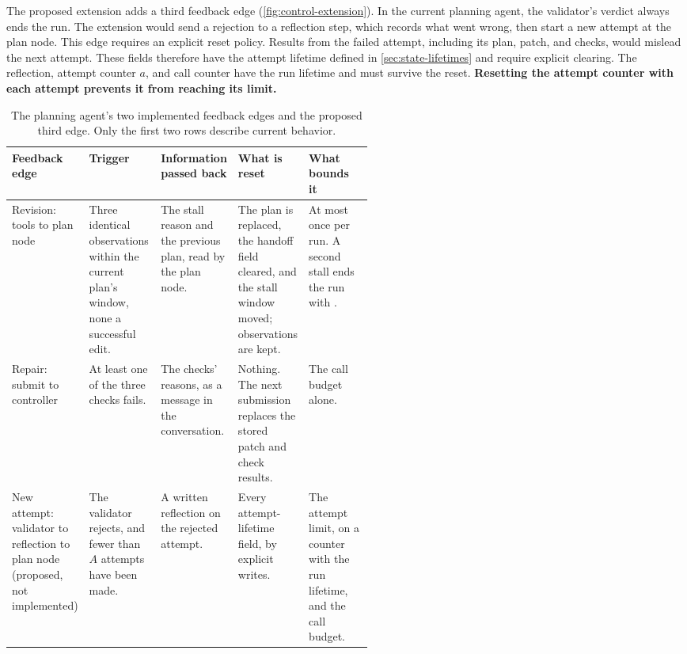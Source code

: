 The proposed extension adds a third feedback edge (\cref{fig:control-extension}). In the current
planning agent, the validator's verdict always ends the run. The extension would send a rejection to a
reflection step, which records what went wrong, then start a new attempt at the plan node. This
edge requires an explicit reset policy. Results from the failed attempt, including its plan,
patch, and checks, would mislead the next attempt. These fields therefore have the attempt lifetime
defined in \cref{sec:state-lifetimes} and require explicit clearing. The reflection, attempt counter
$a$, and call counter have the run lifetime and must survive the reset. \textbf{Resetting the
attempt counter with each attempt prevents it from reaching its limit.}

\begin{table}[tbp]
  \centering
  \begin{adjustbox}{width=\linewidth}\begin{tabularx}{\linewidth}{@{}L{0.14\linewidth}L{0.2\linewidth}XXL{0.19\linewidth}@{}}
    \toprule
    \textbf{Feedback edge} & \textbf{Trigger} & \textbf{Information passed back} & \textbf{What is reset}
      & \textbf{What bounds it} \\
    \midrule
    Revision: tools to plan node & Three identical observations within the current plan's window, none a
      successful edit. & The stall reason and the previous plan, read by the plan node. & The plan is
      replaced, the handoff field cleared, and the stall window moved; observations are kept. & At
      most once per run. A second stall ends the run with . \\
    Repair: submit to controller & At least one of the three checks fails. & The checks' reasons, as
      a message in the conversation. & Nothing. The next submission replaces the stored patch and
      check results. & The call budget alone. \\
    New attempt: validator to reflection to plan node (proposed, not implemented) & The validator
      rejects, and fewer than $A$ attempts have been made. & A written reflection on the rejected
      attempt. & Every attempt-lifetime field, by explicit writes. & The attempt limit, on a counter
      with the run lifetime, and the call budget. \\
    \bottomrule
  \end{tabularx}\end{adjustbox}
  \caption{The planning agent's two implemented feedback edges and the proposed third edge. Only the
  first two rows describe current behavior.}
  \label{tab:control-backedges}
\end{table}

